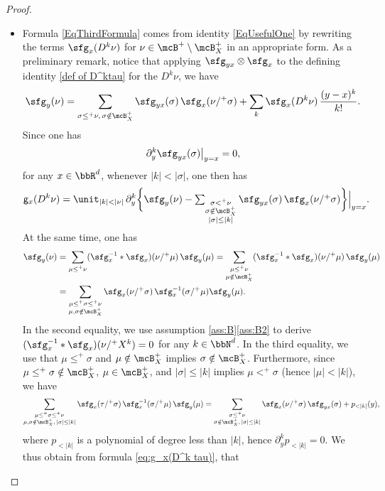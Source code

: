 \begin{proof}
\begin{itemize}
\item
Formula \eqref{EqThirdFormula} comes from identity \eqref{EqUsefulOne} by rewriting the terms ${\sfg}_x(D^k\nu)$ for $\nu\in\mcB^+\setminus\mcB_X^+$ in an appropriate form. As a preliminary remark, notice that applying $\sfg_{yx}\otimes\sfg_x$ to the defining identity \eqref{def of D^ktau} for the $D^k\nu$, we have
\begin{align*}
\sfg_y(\nu) = \sum_{\sigma\leq^+\nu,\, \sigma\notin\mcB_X^+} \sfg_{yx}(\sigma)\,\sfg_x(\nu/^+\sigma) + \sum_k\sfg_x(D^k\nu)\,\frac{(y-x)^k}{k!}.
\end{align*}
Since one has
\[
\partial_y^k\sfg_{yx}(\sigma)\big|_{y=x} = 0,
\]
for any $x\in\bbR^d$, whenever $|k| < |\sigma|$, one then has
\begin{align}\label{eq:g_x(D^k tau)}
{\sf g}_x(D^k\nu) = \unit_{|k|<|\nu|}\, \partial_y^k\bigg\{\sfg_y(\nu) - \textstyle\sum_{\substack{\sigma<^+\nu\\\sigma\notin\mcB_X^+\\|\sigma| \leq |k|}} \sfg_{yx}(\sigma)\,\sfg_x(\nu/^+\sigma)\bigg\}\Big|_{y=x}.
\end{align}
At the same time, one has
\begin{align*}
\sfg_y(\nu) &= \sum_{\substack{\mu\le^+\nu}} (\sfg_x^{-1}*\sfg_x)(\nu/^+\mu)\,\sfg_y(\mu) = \sum_{\substack{\mu\le^+\nu \\ \mu\notin\mcB_X^+}} (\sfg_x^{-1}*\sfg_x)(\nu/^+\mu)\,\sfg_y(\mu) \\
&= \sum_{\substack{\mu\le^+\sigma\le^+\nu \\ \mu,\sigma\notin\mcB_X^+}} \sfg_x(\nu/^+\sigma)\,\sfg_x^{-1}(\sigma/^+\mu)\sfg_y(\mu).
\end{align*}
In the second equality, we use assumption \ref{ass:B}\eqref{ass:B2} to derive $(\sfg_x^{-1}*\sfg_x)(\nu/^+X^k)=0$ for any $k\in\bbN^d$.
In the third equality, we use that $\mu\le^+\sigma$ and $\mu\notin\mcB_X^+$ implies $\sigma\notin\mcB_X^+$. Furthermore, since $\mu\le^+\sigma\notin\mcB_X^+$, $\mu\in\mcB_X^+$, and $|\sigma|\le |k|$ implies $\mu<^+\sigma$ (hence $|\mu|<|k|$), we have
\begin{align*}
\sum_{\substack{\mu\le^+\sigma\le^+\nu \\ \mu,\sigma\notin\mcB_X^+,\,|\sigma|\le|k|}} \sfg_x(\tau/^+\sigma)\,\sfg_x^{-1}(\sigma/^+\mu)\,\sfg_y(\mu) = \sum_{\substack{\sigma\le^+\nu \\ \sigma\notin\mcB_X^+,\,|\sigma|\le|k|}} \sfg_x(\nu/^+\sigma)\,\sfg_{yx}(\sigma)+p_{<|k|}(y),
\end{align*}
where $p_{<|k|}$ is a polynomial of degree less than $|k|$, hence $\partial^k_yp_{<|k|}=0$. We thus obtain from formula \eqref{eq:g_x(D^k tau)}, that

\end{itemize}
\end{proof}
